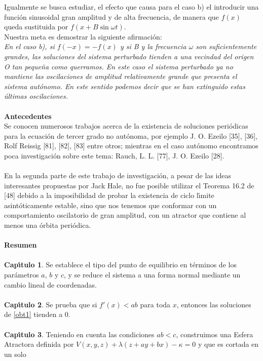 \documentclass[letter]{article}
\begin{document}
Igualmente se busca  estudiar, el  efecto que causa para el caso
b) el introducir una funci{\'o}n  sinusoidal gran amplitud y  de alta
frecuencia, de manera que $f(x)$ queda sustituida por
$f(x+B\sin\omega t)$.
\\
Nuestra meta es demostrar la siguiente afirmaci{\'o}n:
\\
\emph{En el caso b), si $f(-x)=-f(x)$ y si  B y la frecuencia
$\omega$ son suficientemente grandes, las soluciones del sistema
perturbado tienden a una vecindad del origen O tan peque{\~n}a como
querramos. En este caso el sistema perturbado ya no mantiene las
oscilaciones de amplitud re\-lativamente grande que presenta el
sistema aut{\'o}nomo. En este sentido podemos decir que se han
extinguido estas {\'u}ltimas oscilaciones. }
\\
\\
{\bf\Large{Antecedentes}}
\\
Se conocen numerosos trabajos acerca de la existencia de
soluciones peri{\'o}dicas para la ecuaci{\'o}n de tercer grado no
aut{\'o}noma, por ejemplo J. O. Ezeilo [35], [36], Rolf Reissig [81],
[82], [83] entre otros; mientras en el caso aut{\'o}nomo encontramos
poca investigaci{\'o}n sobre este tema: Rauch, L. L. [77], J. O.
Ezeilo [28].
\\
\\
En  la segunda parte de este trabajo de investigaci{\'o}n, a pesar de
las ideas interesantes propuestas por Jack Hale, no  fue posible
utilizar el Teorema 16.2 de [48] debido a la imposibilidad de
probar la existencia de ciclo l{\'\i}mite asint{\'o}ticamente estable, sino
que nos tenemos que conformar con un comportamiento oscilatorio de
gran amplitud, con un atractor que contiene al menos una {\'o}rbita
peri{\'o}dica.
\\
\\
{\bf\Large{Resumen}}
\\
\\
{\bf Cap{\'\i}tulo 1}.  Se establece el tipo del punto de equilibrio en
t{\'e}rminos de los par{\'a}metros $a$, $b$ y $c$, y se reduce  el sistema
a una forma normal mediante un cambio lineal de coordenadas.
\\
\\
{\bf Cap{\'\i}tulo 2}. Se prueba que si $f'(x)<ab$ para toda $x$,
entonces las soluciones de \ref{obt1} tienden a 0.
\\
\\
{\bf Cap{\'\i}tulo 3}. Teniendo en cuenta las condiciones $ab<c$,
construimos una Esfera Atractora definida por  $
V(x,y,z)+\lambda(z+ay+bx)-\kappa=0$ y que es cortada en un solo
\end{document}

